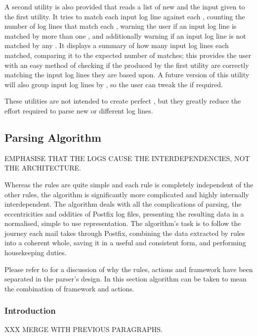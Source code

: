 A second utility is also provided that reads a list of new \regexes{} and
the input given to the first utility.  It tries to match each input log
line against each \regex{}, counting the number of log lines that match
each \regex{}, warning the user if an input log line is matched by more
than one \regex{}, and additionally warning if an input log line is not
matched by any \regex{}.  It displays a summary of how many input log lines
each \regex{} matched, comparing it to the expected number of matches; this
provides the user with an easy method of checking if the \regexes{}
produced by the first utility are correctly matching the input log lines
they are based upon.  A future version of this utility will also group
input log lines by \regex{}, so the user can tweak the \regexes{} if
required.

These utilities are not intended to create perfect \regexes{}, but they
greatly reduce the effort required to parse new or different log lines.

\subsection{Parsing Algorithm}

\label{parsing-algorithm}

EMPHASISE THAT THE LOGS CAUSE THE INTERDEPENDENCIES, NOT THE
ARCHITECTURE\@.

Whereas the rules are quite simple and each rule is completely independent
of the other rules, the algorithm is significantly more complicated and
highly internally interdependent.  The algorithm deals with all the
complications of parsing, the eccentricities and oddities of Postfix log
files, presenting the resulting data in a normalised, simple to use
representation.  The algorithm's task is to follow the journey each mail
takes through Postfix, combining the data extracted by rules into a
coherent whole, saving it in a useful and consistent form, and performing
housekeeping duties.

Please refer to  for a discussion of why the
rules, actions and framework have been separated in the parser's design.
In this section algorithm can be taken to mean the combination of framework
and actions.

\subsubsection{Introduction}

XXX MERGE WITH PREVIOUS PARAGRAPHS\@.

